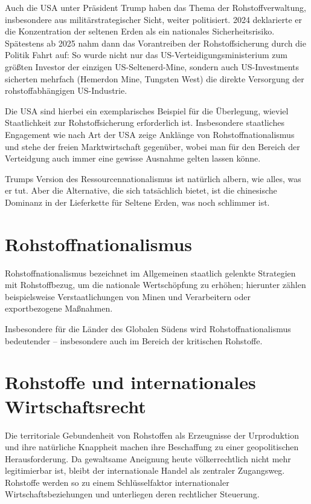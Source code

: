 \documentclass[12pt,a4paper,oneside]{book} %
\begin{document}
Auch die USA unter Präsident Trump haben das Thema der Rohstoffverwaltung, insbesondere aus militärstrategischer Sicht, weiter politisiert. 2024 deklarierte er die Konzentration der seltenen Erden als ein nationales Sicherheitsrisiko.
Spätestens ab 2025 nahm dann das Vorantreiben der Rohstoffsicherung durch die Politik Fahrt auf: So wurde nicht nur das US-Verteidigungsministerium zum größten Investor der einzigen US-Seltenerd-Mine, sondern auch US-Investments sicherten mehrfach (Hemerdon Mine, Tungsten West) die direkte Versorgung der rohstoffabhängigen US-Industrie.

Die USA sind hierbei ein exemplarisches Beispiel für die Überlegung, wieviel Staatlichkeit zur Rohstoffsicherung erforderlich ist. Insbesondere staatliches Engagement wie nach Art der USA zeige Anklänge von Rohstoffnationalismus und stehe der freien Marktwirtschaft gegenüber, wobei man für den Bereich der Verteidgung auch immer eine gewisse Ausnahme gelten lassen könne.\autocite{bibid}

Trumps Version des Ressourcennationalismus ist natürlich albern, wie alles, was er tut. Aber die Alternative, die sich tatsächlich bietet, ist die chinesische Dominanz in der Lieferkette für Seltene Erden, was noch schlimmer ist.

\section{Rohstoffnationalismus}

Rohstoffnationalismus bezeichnet im Allgemeinen staatlich gelenkte Strategien mit Rohstoffbezug, um die nationale Wertschöpfung zu erhöhen; hierunter zählen beispielsweise Verstaatlichungen von Minen und Verarbeitern oder exportbezogene Maßnahmen.

Insbesondere für die Länder des Globalen Südens wird Rohstoffnationalismus bedeutender -- insbesondere auch im Bereich der kritischen Rohstoffe.


\section{Rohstoffe und internationales Wirtschaftsrecht}
Die territoriale Gebundenheit von Rohstoffen als Erzeugnisse der Urproduktion und ihre natürliche Knappheit machen ihre Beschaffung zu einer geopolitischen Herausforderung. Da gewaltsame Aneignung heute völkerrechtlich nicht mehr legitimierbar ist, bleibt der internationale Handel als zentraler Zugangsweg. Rohstoffe werden so zu einem Schlüsselfaktor internationaler Wirtschaftsbeziehungen und unterliegen deren rechtlicher Steuerung.\autocite{Terhechte, Rohstoffverwaltung, Rn. 5}
\end{document}
